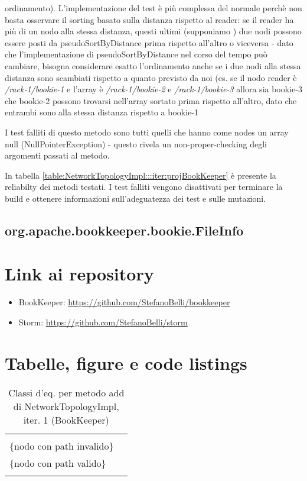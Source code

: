 \documentclass[10pt, a4paper]{article}
\newcommand{\Intmaketable}[4]{
	\begin{longtable}{#3}
	#4
	\caption{#2}
	\label{#1}
	\end{longtable}
}
\newcommand{\Intceqtable}[3]{
	\Intmaketable{#1}{#2}{|l|l|}{
	\hline
	\thead{Parametro formale} & \thead{Classi d'equivalenza} \\
	\hline
	\hline
	#3
	\hline}
}
\newcommand{\Intceqcaption}[4]{Classi d'eq. per metodo #1 di #2, iter. #3 (#4)}
\newcommand{\gettablelabel}[5]{table:#1:#2:#3:iter#4:proj#5}
\newcommand{\getreltablelabel}[2]{\gettablelabel{#1}{}{}{}{#2}}
\newcommand{\ceqtable}[5]{
	\Intceqtable{\gettablelabel{ceq}{#1}{#2}{#3}{#4}}
		{\Intceqcaption{#1}{#2}{#3}{#4}}
		{#5}
}
\newcommand{\tcell}{\makecell[tl]}
\newcommand{\newtrow}{\\ \hline}
\def\bookkeeper{BookKeeper}
\newcommand{\ceq}[1]{\{#1\}}
\begin{document}
	ordinamento). L'implementazione del test è più complessa del normale perchè
	non basta osservare il sorting basato sulla distanza rispetto al reader:
	se il reader ha più di un nodo alla stessa distanza, questi ultimi (supponiamo ) due nodi possono essere posti da pseudoSortByDistance prima rispetto all'altro
	o viceversa - dato che l'implementazione di pseudoSortByDistance nel corso del tempo può cambiare,
	bisogna considerare esatto l'ordinamento anche se i due nodi alla stessa
	distanza sono scambiati rispetto a quanto previsto da noi (es. 
	se il nodo reader è \textit{/rack-1/bookie-1} e l'array è \textit{/rack-1/bookie-2} e \textit{/rack-1/bookie-3} allora sia bookie-3 che bookie-2 possono 
	trovarsi nell'array sortato prima rispetto all'altro, dato che entrambi sono
	alla stessa distanza rispetto a bookie-1
	
	I test falliti di questo metodo sono tutti quelli che hanno come nodes 
	un array null (NullPointerException) - questo rivela un non-proper-checking
	degli argomenti passati al metodo.
	
	In tabella \ref{\getreltablelabel{NetworkTopologyImpl}{\bookkeeper}} è
	presente la reliabilty dei metodi testati. I test falliti vengono disattivati
	per terminare la build e ottenere informazioni sull'adeguatezza dei test e
	sulle mutazioni.

	\subsection{org.apache.bookkeeper.bookie.FileInfo}
	
	\newpage
	\section{Link ai repository}
	\begin{itemize}
		\item BookKeeper: \url{https://github.com/StefanoBelli/bookkeeper}
		\item Storm: \url{https://github.com/StefanoBelli/storm}
	\end{itemize}
	
	\newpage
	\section{Tabelle, figure e code listings}
	
	
	\ceqtable{add}{NetworkTopologyImpl}{1}{\bookkeeper}{
			\tcell{node} & \tcell{\ceq{null} \\ \ceq{nodo con path invalido} \\ \ceq{nodo con path valido} }
		\newtrow
	}
	
\end{document}

